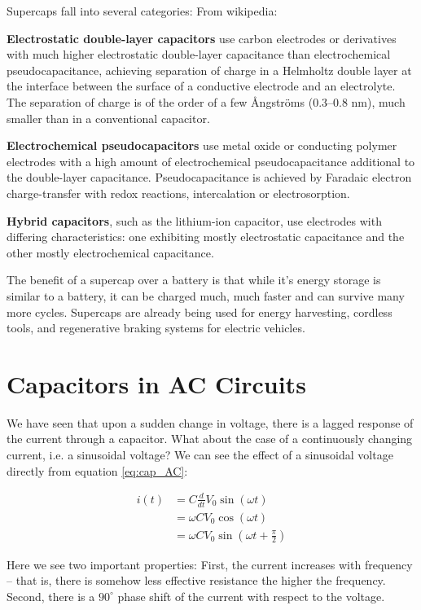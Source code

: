 \documentclass{tufte-book}
\begin{document}
\noindent Supercaps fall into several categories: From wikipedia:

\noindent\textbf{Electrostatic double-layer capacitors} use carbon electrodes or derivatives with much higher electrostatic double-layer capacitance than electrochemical pseudocapacitance, achieving separation of charge in a Helmholtz double layer at the interface between the surface of a conductive electrode and an electrolyte. The separation of charge is of the order of a few \r{A}ngströms (0.3--0.8 nm), much smaller than in a conventional capacitor.

\noindent\textbf{Electrochemical pseudocapacitors} use metal oxide or conducting polymer electrodes with a high amount of electrochemical pseudocapacitance additional to the double-layer capacitance. Pseudocapacitance is achieved by Faradaic electron charge-transfer with redox reactions, intercalation or electrosorption.

\noindent\textbf{Hybrid capacitors}, such as the lithium-ion capacitor, use electrodes with differing characteristics: one exhibiting mostly electrostatic capacitance and the other mostly electrochemical capacitance.

The benefit of a supercap over a battery is that while it's energy storage is similar to a battery, it can be charged much, much faster and can survive many more cycles. Supercaps are already being used for energy harvesting, cordless tools, and regenerative braking systems for electric vehicles.

\section{Capacitors in AC Circuits}
We have seen that upon a sudden change in voltage, there is a lagged response of the current through a capacitor. What about the case of a continuously changing current, i.e. a sinusoidal voltage? We can see the effect of a sinusoidal voltage directly from equation \ref{eq:cap_AC}:

\begin{align}\label{eq:ac_cap_deriv}
i(t) &= C\frac{d}{dt}V_0\sin\left(\omega t\right) \nonumber\\
     &= \omega C V_0\cos\left(\omega t\right) \nonumber\\
     &= \omega C V_0\sin\left(\omega t + \frac{\pi}{2}\right)
\end{align}

\noindent Here we see two important properties: First, the current increases with frequency -- that is, there is somehow less effective resistance the higher the frequency. Second, there is a $90^\circ$ phase shift of the current with respect to the voltage.
\end{document}
